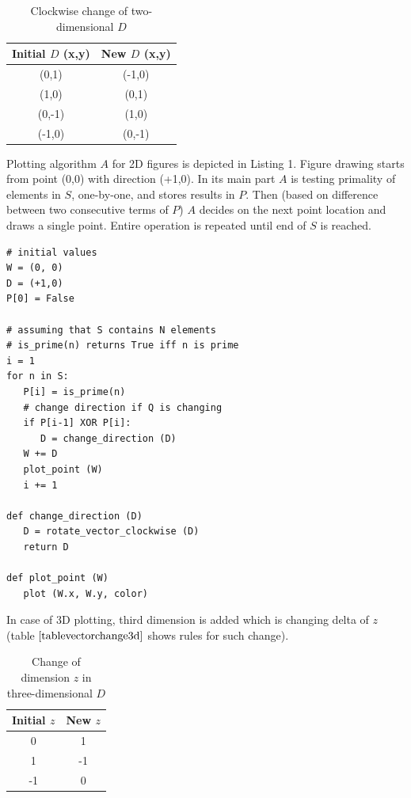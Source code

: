 \documentclass[10pt,twocolumn]{article}
\begin{document}
\begin{table}[h]
\centering
\caption{Clockwise change of two-dimensional $D$}
\label{tablevectorchange}
\begin{tabular}{|c|c|}
  \hline 
  \rowcolor{LightCyan}
   Initial $D$ (x,y) & New $D$ (x,y) \\
  \hline 
  (0,1) & (-1,0) \\
  \hline 
  (1,0) & (0,1) \\
  \hline 
  (0,-1) & (1,0) \\
  \hline 
  (-1,0) & (0,-1) \\
  \hline 
\end{tabular} 
\end{table}

Plotting algorithm $A$ for 2D figures is depicted in Listing 1. Figure drawing starts from point (0,0) with direction (+1,0). In its main part $A$ is testing primality of elements in $S$, one-by-one, and stores results in $P$. Then (based on difference between two consecutive terms of $P$) $A$ decides on the next point location and draws a single point. Entire operation is repeated until end of $S$ is reached.

\lstset{language=Python}
\lstset{breaklines=true}
\lstset{frame=shadowbox}
\label{listingplottingbasics}
\begin{lstlisting}[linewidth=8.7cm]
# initial values
W = (0, 0)
D = (+1,0)
P[0] = False

# assuming that S contains N elements
# is_prime(n) returns True iff n is prime
i = 1
for n in S:
   P[i] = is_prime(n)
   # change direction if Q is changing
   if P[i-1] XOR P[i]:
      D = change_direction (D)   
   W += D
   plot_point (W)
   i += 1

def change_direction (D)
   D = rotate_vector_clockwise (D)
   return D

def plot_point (W)
   plot (W.x, W.y, color)
\end{lstlisting}

 In case of 3D plotting, third dimension is added which is changing delta of $z$ (table $\ref{tablevectorchange3d}$ shows rules for such change).

\begin{table}[h]
\centering
\caption{Change of dimension $z$ in three-dimensional $D$}
\label{tablevectorchange3d}
\begin{tabular}{|c|c|}
  \hline 
  \rowcolor{LightCyan}
   Initial $z$ & New $z$ \\
  \hline 
  0 & 1 \\
  \hline 
  1 & -1 \\
  \hline 
  -1 & 0 \\
  \hline 
\end{tabular} 
\end{table}
\end{document}

